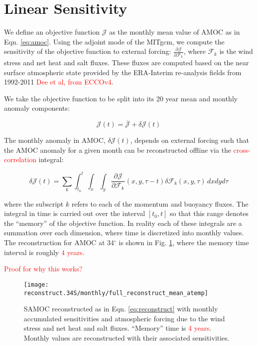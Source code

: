 \documentclass[a4paper,11pt]{article}
\newcommand{\pderiv}[3][]{%
  \ensuremath{\frac{\partial^{#1} {#2}}{\partial {#3}^{#1}}}}
\newcommand{\red}[1]{\textcolor{red}{#1}}
\begin{document}
  \section{Linear Sensitivity}
  \label{linearSensitivity}
  
  We define an objective function $\mathcal{J}$ as the monthly mean value of AMOC as in Eqn. \ref{eq:amoc}. Using the adjoint mode of the MITgcm, we compute the sensitivity of the objective function to external forcing: $\pderiv{\mathcal{J}}{\mathcal{F}_k}$, where $\mathcal{F}_k$ is the wind stress and net heat and salt fluxes. These fluxes are computed based on the near surface atmospheric state provided by the ERA-Interim re-analysis fields from 1992-2011 \red{Dee et al, from ECCOv4}. 
	
  We take the objective function to be split into its 20 year mean and monthly anomaly components: 

	\begin{equation}
	  \mathcal{J}(t) = \bar{\mathcal{J}} + \delta\mathcal{J}(t) 
	\end{equation}

  The monthly anomaly in AMOC, $\delta\mathcal{J}(t)$, depends on external forcing such that the AMOC anomaly for a given month can be reconstructed offline via the \red{cross-correlation} integral:
 
	\begin{equation}
	  \delta\mathcal{J}(t) = \sum_k\int_{t_0}^{t}\int_x \int_y\pderiv{\mathcal{J}}{\mathcal{F}_k}(x,y,\tau-t)\delta\mathcal{F}_k(x,y,\tau)\, dxdyd\tau  
	  \label{eq:reconstruct}
	\end{equation}

  where the subscript $k$ refers to each of the momentum and buoyancy fluxes. The integral in time is carried out over the interval $[t_0, t]$ so that this range denotes the ``memory'' of the objective function. In reality each of these integrals are a summation over each dimension, where time is discretized into monthly values. The reconstruction for AMOC at 34$^{\circ}$ is shown in Fig. \ref{fig:fullReconstruction}, where the memory time interval is roughly \red{4 years}.
 
  \red{Proof for why this works?}  

   \begin{figure}
    \centering
    \texttt{[image: reconstruct.34S/monthly/full\_reconstruct\_mean\_atemp]}
    \caption{SAMOC reconstructed as in Eqn. \ref{eq:reconstruct} with monthly accumulated sensitivities and atmospheric forcing due to the wind stress and net heat and salt fluxes. ``Memory'' time is \red{4 years}. Monthly values are reconstructed with their associated sensitivities.}
    \label{fig:fullReconstruction}
   \end{figure}
\end{document}
